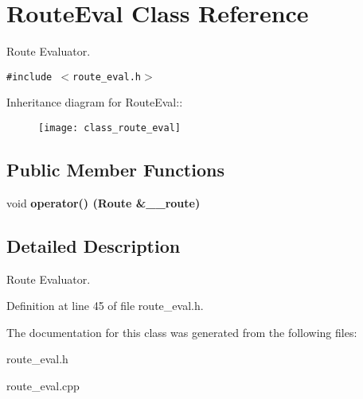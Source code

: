 \section{Route\-Eval Class Reference}
\label{class_route_eval}
Route Evaluator.  


{\tt \#include $<$route\_\-eval.h$>$}

Inheritance diagram for Route\-Eval::\begin{figure}[H]
\begin{center}
\leavevmode
\texttt{[image: class\_route\_eval]}
\end{center}
\end{figure}
\subsection*{Public Member Functions}
\begin{CompactItemize}
\item 
void \bf{operator()} (\bf{Route} \&\_\-\_\-route)\label{class_route_eval_e10bbe6f792e6f44405953de4f703901}

\end{CompactItemize}


\subsection{Detailed Description}
Route Evaluator. 



Definition at line 45 of file route\_\-eval.h.

The documentation for this class was generated from the following files:\begin{CompactItemize}
\item 
route\_\-eval.h\item 
route\_\-eval.cpp\end{CompactItemize}
